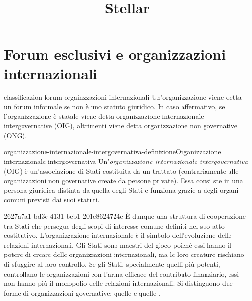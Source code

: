 \documentclass[preview]{standalone}
\begin{document}
\title{Stellar}
\genpage

\section{Forum esclusivi e organizzazioni internazionali}

\begin{snippet}{classificazion-forum-orgainzzazioni-internazionali}
    Un'organizzazione viene detta un forum informale se non è uno statuto giuridico.
    In caso affermativo, se l'organizzazione è statale viene detta
    organizzazione internazionale intergovernative (OIG), altrimenti viene detta
    organizzazione non governative (ONG).
\end{snippet}

\begin{snippetdefinition}{organizzazione-internazionale-intergovernativa-definizione}{Organizzazione internazionale intergovernativa}
    Un'\textit{organizzazione internazionale intergovernativa} (OIG) è un'associazione di Stati costituita da un
    trattato (contrariamente alle organizzazioni non governative create da persone private).
    Essa consi ste in una persona giuridica distinta da quella degli Stati e funziona grazie a degli organi comuni
    previsti dai suoi statuti.
\end{snippetdefinition}

\begin{snippet}{2627a7a1-bd3c-4131-beb1-201e8624724c}
    È dunque una struttura di cooperazione tra Stati che persegue degli scopi di
    interesse comune definiti nel suo atto costitutivo.
    L'organizzazione internazionale è il simbolo dell'evoluzione delle relazioni internazionali. Gli Stati
    sono maestri del gioco poiché essi hanno il potere di creare delle organizzazioni internazionali, ma
    le loro creature rischiano di sfuggire al loro controllo. Se gli Stati, specialmente quelli più potenti,
    controllano le organizzazioni con l'arma efficace del contributo finanziario, essi non hanno più il monopolio delle relazioni internazionali.
    Si distinguono due forme di organizzazioni governative: quelle  e quelle .
\end{snippet}

\end{document}
